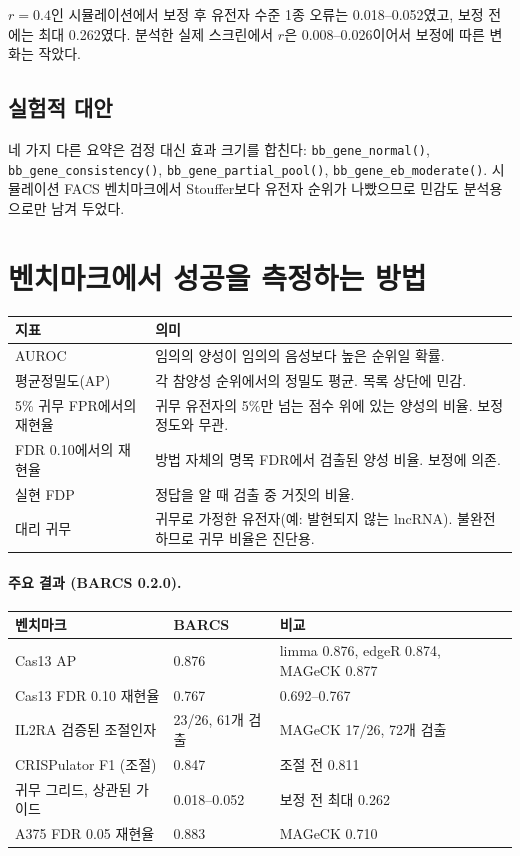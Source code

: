 \documentclass[11pt]{article}
\begin{document}
$r=0.4$인 시뮬레이션에서 보정 후 유전자 수준 1종 오류는 0.018--0.052였고,
보정 전에는 최대 0.262였다. 분석한 실제 스크린에서 $\hat r$은 0.008--0.026이어서
보정에 따른 변화는 작았다.

\subsection{실험적 대안}

네 가지 다른 요약은 검정 대신 효과 크기를 합친다:
\texttt{bb\_gene\_normal()}, \texttt{bb\_gene\_consistency()},
\texttt{bb\_gene\_partial\_pool()}, \texttt{bb\_gene\_eb\_moderate()}.
시뮬레이션 FACS 벤치마크에서 Stouffer보다 유전자 순위가 나빴으므로 민감도
분석용으로만 남겨 두었다.

\section{벤치마크에서 성공을 측정하는 방법}

\begin{center}
\begin{tabular}{lp{}}
\toprule
지표 & 의미\\
\midrule
AUROC & 임의의 양성이 임의의 음성보다 높은 순위일 확률.\\
평균정밀도(AP) & 각 참양성 순위에서의 정밀도 평균. 목록 상단에 민감.\\
5\% 귀무 FPR에서의 재현율 & 귀무 유전자의 5\%만 넘는 점수 위에 있는 양성의
비율. 보정 정도와 무관.\\
FDR 0.10에서의 재현율 & 방법 자체의 명목 FDR에서 검출된 양성 비율. 보정에
의존.\\
실현 FDP & 정답을 알 때 검출 중 거짓의 비율.\\
대리 귀무 & 귀무로 가정한 유전자(예: 발현되지 않는 lncRNA). 불완전하므로 귀무
비율은 진단용.\\
\bottomrule
\end{tabular}
\end{center}

\paragraph{주요 결과 (BARCS 0.2.0).}
\begin{center}
\begin{tabular}{lll}
\toprule
벤치마크 & BARCS & 비교\\
\midrule
Cas13 AP & 0.876 & limma 0.876, edgeR 0.874, MAGeCK 0.877\\
Cas13 FDR 0.10 재현율 & 0.767 & 0.692--0.767\\
IL2RA 검증된 조절인자 & 23/26, 61개 검출 & MAGeCK 17/26, 72개 검출\\
CRISPulator F1 (조절) & 0.847 & 조절 전 0.811\\
귀무 그리드, 상관된 가이드 & 0.018--0.052 & 보정 전 최대 0.262\\
A375 FDR 0.05 재현율 & 0.883 & MAGeCK 0.710\\
\bottomrule
\end{tabular}
\end{center}
\end{document}
